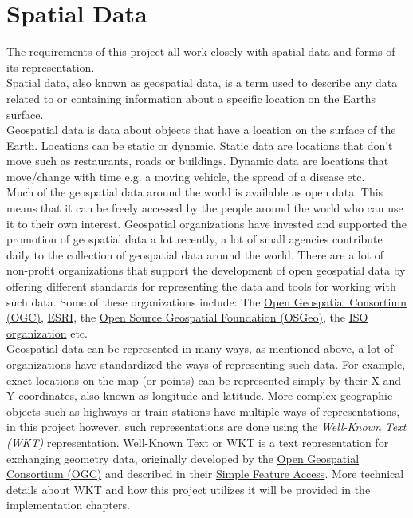 \pagebreak
\section{Spatial Data}
The requirements of this project all work closely with spatial data and forms of its representation.\\
\newline
Spatial data, also known as geospatial data, is a term used to describe any data related to or containing information
about a specific location on the Earth\textquotesingle s surface.~\cite{AboutGeoSpatialData}\\
\newline
Geospatial data is data about objects that have a location on the surface of the Earth.
Locations can be static or dynamic. Static data are locations that don't move such as restaurants, roads or buildings.
Dynamic data are locations that move/change with time e.g. a moving vehicle, the spread of a disease etc.\\
\newline
Much of the geospatial data around the world is available as open data. This means that it can be freely accessed by the people
around the world who can use it to their own interest. Geospatial organizations have invested and supported the promotion of
geospatial data a lot recently, a lot of small agencies contribute daily to the collection of geospatial data around the world.
There are a lot of non-profit organizations that support the development of open geospatial data by offering different standards
for representing the data and tools for working with such data. Some of these organizations include: The \href{https://www.ogc.org/}{Open Geospatial Consortium (OGC)},
\href{https://www.esri.com/en-us/home}{ESRI}, the \href{https://www.osgeo.org/}{Open Source Geospatial Foundation (OSGeo)},
the \href{https://www.iso.org/home.html}{ISO organization} etc.\\
\newline
Geospatial data can be represented in many ways, as mentioned above, a lot of organizations have standardized the ways of representing
such data. For example, exact locations on the map (or points) can be represented simply by their X and Y coordinates, also known as longitude and latitude.
More complex geographic objects such as highways or train stations have multiple ways of representations, in this project however, such representations
are done using the \textit{Well-Known Text (WKT)} representation. Well-Known Text or WKT is a text representation for exchanging geometry data, originally developed by
the \href{https://www.ogc.org/}{Open Geospatial Consortium (OGC)} and described in their \href{https://www.ogc.org/standards/sfa#overview}{Simple Feature Access}.
More technical details about WKT and how this project utilizes it will be provided in the implementation chapters.\\
\newline
\pagebreak
